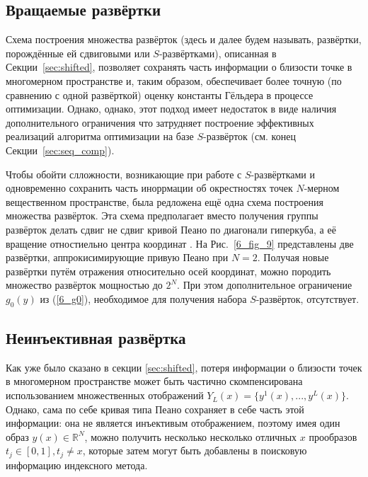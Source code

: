 \subsection{Вращаемые развёртки}
Схема построения множества развёрток (здесь и далее будем называть, развёртки, порождённые ей сдвиговыми
или $S$-развёртками), описанная в Секции~\ref{sec:shifted}, позволяет сохранять часть информации
о близости точке в многомерном пространстве и, таким образом, обеспечивает более точную (по сравнению с одной развёрткой)
оценку константы Гёльдера в процессе оптимизации. Однако, однако, этот подход имеет недостаток в виде наличия дополнительного ограничения
что затрудняет построение эффективных реализаций алгоритма оптимизации на базе $S$-развёрток (см. конец Секции~\ref{sec:seq_comp}).

Чтобы обойти слложности, возникающие при работе с $S$-развёртками и одновременно сохранить часть иноррмации об окрестностях точек
$N$-мерном вещественном пространстве, была редложена ещё одна схема построения множества развёрток.
Эта схема предполагает вместо получения группы развёрток делать сдвиг не сдвиг кривой Пеано по диагонали гиперкуба, а
её вращение отностиельно центра координат \cite{Gergel2009}.
На Рис.~\ref{6_fig_9} представлены две развёртки, аппрокисимирующие привую Пеано при $N=2$.
Получая новые развёртки путём отражения относительно осей координат, можно породить множество развёрток
мощностью до $2^N$. При этом дополнительное ограничение $g_0(y)$ из (\ref{6_g0}), необходимое для получения
набора $S$-развёрток, отсутствует.

\subsection{Неинъективная развёртка}

Как уже было сказано в секции \ref{sec:shifted}, потеря информации о близости точек в многомерном
пространстве может быть частично скомпенсирована использованием множественных отображений $Y_L(x)=\{y^1(x),...,y^L(x)\}$.
Однако, сама по себе кривая типа Пеано сохраняет в себе часть этой информации: она не является инъективым отображением,
поэтому имея один образ $y(x)\in \mathbb{R}^N$, можно получить несколько несколько отличных $x$ прообразов $t_j\in[0,1], t_j \not = x$,
которые затем могут быть добавлены в поисковую информацию индексного метода.


